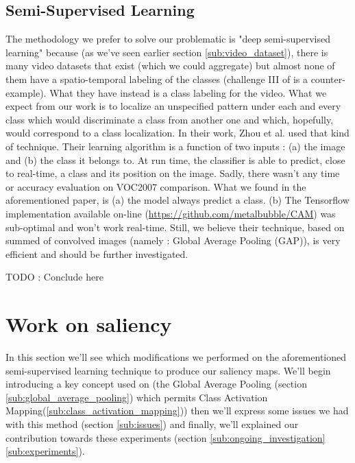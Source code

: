 		\subsection{Semi-Supervised Learning}
		\label{sub:semi_supervised_learning}
			The methodology we prefer to solve our problematic is "deep semi-supervised learning" because (as we've seen earlier section \ref{sub:video_dataset}), there is many video datasets that exist (which we could aggregate) but almost none of them have a spatio-temporal labeling of the classes (challenge III of \cite{ILSVRC15} is a counter-example). What they have instead is a class labeling for the video. What we expect from our work is to localize an unspecified pattern under each and every class which would discriminate a class from another one and which, hopefully, would correspond to a class localization. In their work, Zhou et al. \cite{zhou2015learning} used that kind of technique. Their learning algorithm is a function of two inputs : (a) the image and (b) the class it belongs to. At run time, the classifier is able to predict, close to real-time, a class and its position on the image. Sadly, there wasn't any time or accuracy evaluation on VOC2007 comparison. 
			What we found in the aforementioned paper, is (a) the model always predict a class. (b) The Tensorflow implementation available on-line (\url{https://github.com/metalbubble/CAM}) was sub-optimal and won't work real-time. Still, we believe their technique, based on summed of convolved images (namely : Global Average Pooling (GAP)), is very efficient and should be further investigated.

		TODO : Conclude here %


	
	\section{Work on saliency}
	\label{sec:work_on_saliency}

		In this section we'll see which modifications we performed on the aforementioned semi-supervised learning technique to produce our saliency maps. We'll begin introducing a key concept used on \cite{zhou2015learning} (the Global Average Pooling (section \ref{sub:global_average_pooling}) which permits Class Activation Mapping(\ref{sub:class_activation_mapping})) then we'll express some issues we had with this method (section \ref{sub:issues}) and finally, we'll explained our contribution towards these experiments (section \ref{sub:ongoing_investigation} \ref{sub:experiments}).

